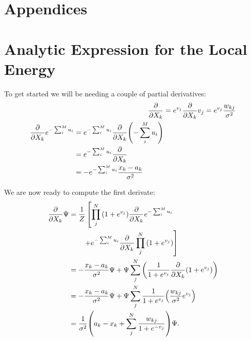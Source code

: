 \documentclass[a4paper, 11pt]{article}
\begin{document}
\begin{multicols}{2}

    \printbibliography

\end{multicols}




\pagebreak
\begin{multicols}{2}
    \appendix
    \section*{Appendices}

    \section{Analytic Expression for the Local Energy}
    \label{app:E-L-derivation}
    
    To get started we will be needing a couple of partial derivatives:
   \begin{align}
        \pdv{}{X_k} (1+e^{v_j}) &=e^{v_j}\pdv{}{X_k}v_j =
        e^{v_j} \frac{w_{kj}}{\sigma^2}\\
        \begin{split}
        \pdv{}{X_k}e^{-\sum_i^M u_i} &= e^{-\sum_i^M
        u_i}\pdv{}{X_k}\qty(-\sum_i^M u_i) \\
        &= e^{-\sum_i^M u_i}\pdv{}{X_k} (-u_k) \\
        &= -e^{-\sum_i^M u_i} \frac{x_k-a_k}{\sigma^2}
        \end{split}
    \end{align}

    We are now ready to compute the first derivate:
    \begin{align*}
        \pdv{}{X_k}\Psi &= \frac{1}{Z} \left[\prod_j^N
        \qty(1+e^{v_j})\pdv{}{X_k}e^{-\sum_i^M u_i}\right.\\
        &\quad{  }\quad{    }\left. + e^{-\sum_i^M
        u_i}\pdv{}{X_k} \prod_j^N \qty(1+e^{v_j})\right]\\
        &= -\frac{x_k-a_k}{\sigma^2}\Psi + \Psi \sum_j^N
        \qty(\frac{1}{1+e^{v_j}}\pdv{}{X_k}\qty(1+e^{v_j}))\\
        &= -\frac{x_k-a_k}{\sigma^2}\Psi + \Psi\sum_j^N
        \frac{1}{1+e^{v_j}}\qty(\frac{w_{kj}}{\sigma^2} e^{v_j})\\
        &= \frac{1}{\sigma^2}\qty(a_k-x_k + \sum_j^N
        \frac{w_{kj}}{1+e^{-v_j}})\Psi.
    \end{align*}


\end{multicols}
\end{document}
